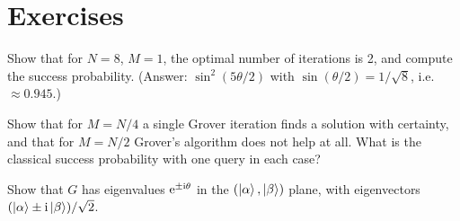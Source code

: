 \section{Exercises}
\begin{exercise}
Show that for $N=8$, $M=1$, the optimal number of iterations is 2, and compute the success probability. (Answer: $\sin^2(5\theta/2)$ with $\sin(\theta/2)=1/\sqrt8$, i.e.\ $\approx0.945$.)
\end{exercise}
\begin{exercise}
Show that for $M=N/4$ a single Grover iteration finds a solution with certainty, and that for $M=N/2$ Grover's algorithm does not help at all. What is the classical success probability with one query in each case?
\end{exercise}
\begin{exercise}
Show that $G$ has eigenvalues $\mathrm e^{\pm\mathrm i\theta}$ in the $(\left|\alpha\right\rangle,\left|\beta\right\rangle)$ plane, with eigenvectors $(\left|\alpha\right\rangle\pm\mathrm i\left|\beta\right\rangle)/\sqrt2$.
\end{exercise}
